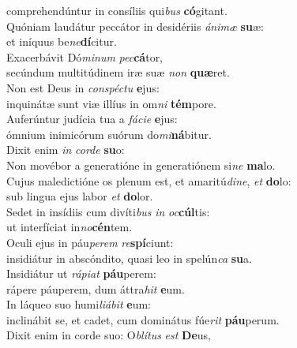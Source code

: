 \oddverse comprehendúntur in consíliis qui\textit{bus} \textbf{có}gitant.\\
\evenverse Quóniam laudátur peccátor in desidériis \textit{á}\textit{ni}\textit{mæ} \textbf{su}æ:~\*\\
\evenverse et iníquus be\textit{ne}\textbf{dí}citur.\\
\oddverse Exacerbávit Dó\textit{mi}\textit{num} \textit{pec}\textbf{cá}tor,~\*\\
\oddverse secúndum multitúdinem iræ suæ \textit{non} \textbf{quæ}ret.\\
\evenverse Non est Deus in \textit{con}\textit{spé}\textit{ctu} \textbf{e}jus:~\*\\
\evenverse inquinátæ sunt viæ illíus in om\textit{ni} \textbf{tém}pore.\\
\oddverse Auferúntur judícia tua a \textit{fá}\textit{ci}\textit{e} \textbf{e}jus:~\*\\
\oddverse ómnium inimicórum suórum do\textit{mi}\textbf{ná}bitur.\\
\evenverse Dixit enim \textit{in} \textit{cor}\textit{de} \textbf{su}o:~\*\\
\evenverse Non movébor a generatióne in generatiónem si\textit{ne} \textbf{ma}lo.\\
\oddverse Cujus maledictióne os plenum est, et amaritú\textit{di}\textit{ne}, \textit{et} \textbf{do}lo:~\*\\
\oddverse sub lingua ejus labor \textit{et} \textbf{do}lor.\\
\evenverse Sedet in insídiis cum divíti\textit{bus} \textit{in} \textit{oc}\textbf{cúl}tis:~\*\\
\evenverse ut interfíciat in\textit{no}\textbf{cén}tem.\\
\oddverse Oculi ejus in páu\textit{pe}\textit{rem} \textit{re}\textbf{spí}ciunt:~\*\\
\oddverse insidiátur in abscóndito, quasi leo in spelún\textit{ca} \textbf{su}a.\\
\evenverse Insidiátur ut \textit{rá}\textit{pi}\textit{at} \textbf{páu}perem:~\*\\
\evenverse rápere páuperem, dum áttra\textit{hit} \textbf{e}um.\\
\oddverse In láqueo suo humi\textit{li}\textit{á}\textit{bit} \textbf{e}um:~\*\\
\oddverse inclinábit se, et cadet, cum dominátus fúe\textit{rit} \textbf{páu}perum.\\
\evenverse Dixit enim in corde suo: O\textit{blí}\textit{tus} \textit{est} \textbf{De}us,~\*\\
